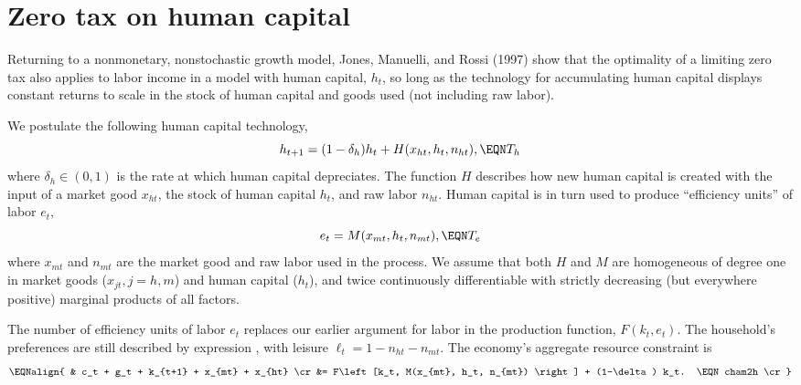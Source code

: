 



 
  
\section{Zero tax on human capital}
Returning to a nonmonetary, nonstochastic growth model, Jones, Manuelli, and Rossi (1997)
show that the optimality of a limiting zero tax also applies to labor
income in a model with human capital, $h_t$, so long as the technology
for accumulating human capital displays constant returns to scale in
the stock of human capital and goods used (not including raw labor).

We postulate the following human capital technology,
$$
h_{t+1} = (1-\delta_h) h_t + H(x_{ht}, h_t, n_{ht}),   \EQN T_h
$$
where $\delta_h \in (0,1)$ is the rate at which human capital
depreciates. The function $H$ describes how new human capital
is created with the input of a market good $x_{ht}$, the stock
of human capital $h_t$, and raw labor $n_{ht}$. Human capital
is in turn used to produce ``efficiency units'' of labor $e_t$,
$$
e_t = M(x_{mt}, h_t, n_{mt}),                          \EQN T_e
$$
where $x_{mt}$ and $n_{mt}$ are the market good and raw labor
used in the process. We assume that both $H$ and $M$ are
homogeneous of degree one in market goods ($x_{jt}, j=h,m$)
and human capital ($h_t$), and twice continuously differentiable
with strictly decreasing (but everywhere positive) marginal
products of all factors.

The number of  efficiency units of labor $e_t$ replaces our earlier argument
for labor in the production function,
$F(k_t, e_t)$. The household's preferences are still
described by  expression , with leisure
$\ell_t = 1 - n_{ht} - n_{mt}$. The economy's
aggregate resource constraint is
$$\EQNalign{ & c_t + g_t + k_{t+1} + x_{mt} + x_{ht}  \cr
  &= F\left[k_t, M(x_{mt}, h_t, n_{mt}) \right] + (1-\delta) k_t. \EQN cham2h
                                                                        \cr}$$

